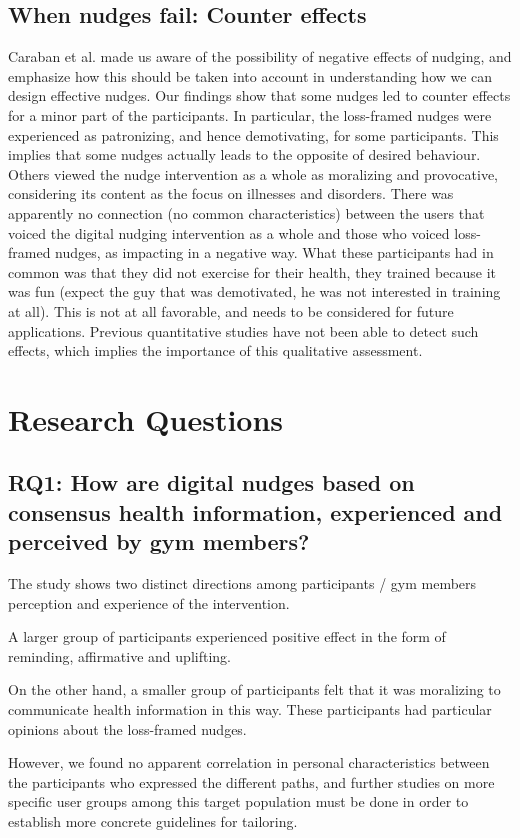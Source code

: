 \subsection{When nudges fail: Counter effects}
Caraban et al. \cite{caraban_23_2019} made us aware of the possibility of negative effects of nudging, and emphasize how this should be taken into account in understanding how we can design effective nudges. Our findings show that some nudges led to counter effects for a minor part of the participants. In particular, the loss-framed nudges were experienced as patronizing, and hence demotivating, for some participants. This implies that some nudges actually leads to the opposite of desired behaviour. Others viewed the nudge intervention as a whole as moralizing and provocative, considering its content as the focus on illnesses and disorders. There was apparently no connection (no common characteristics) between the users that voiced the digital nudging intervention as a whole and those who voiced loss-framed nudges, as impacting in a negative way. What these participants had in common was that they did not exercise for their health, they trained because it was fun (expect the guy that was demotivated, he was not interested in training at all). This is not at all favorable, and needs to be considered for future applications. Previous quantitative studies have not been able to detect such effects, which implies the importance of this qualitative assessment.  

\section{Research Questions}
\subsection{RQ1: How are digital nudges based on consensus health information, experienced and perceived by gym members?}

The study shows two distinct directions among participants / gym members perception and experience of the intervention. 

A larger group of participants experienced positive effect in the form of reminding, affirmative and uplifting. 


On the other hand, a smaller group of participants felt that it was moralizing to communicate health information in this way. These participants had particular opinions about the loss-framed nudges. 

However, we found no apparent correlation in personal characteristics between the participants who expressed the different paths, and further studies on more specific user groups among this target population must be done in order to establish more concrete guidelines for tailoring. 
